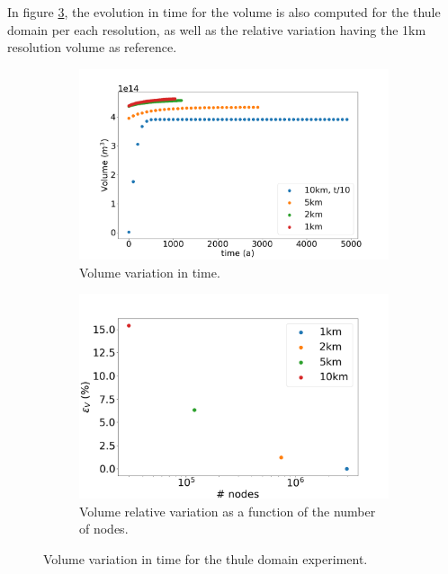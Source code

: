 \documentclass{article}
\begin{document}
In figure \ref{Volume_THULE_VS_TIME_VS_NODES}, the evolution in time for the volume is also computed for the thule domain per each resolution, as well as the relative variation having the 1km resolution volume as reference. 

\begin{figure}[!h]
	\centering
	\begin{subfigure}{.5\textwidth}
		\centering
		\includegraphics[width=1.1\linewidth]{../fig/Volume_THULE_full_all_res_vs_time.png}
		\caption{Volume variation in time.}
		\label{VOLUME_THULE_VS_TIME}
	\end{subfigure}%
	\begin{subfigure}{.5\textwidth}
		\centering
		\includegraphics[width=1.1\linewidth]{../fig/Volume_THULE_full_all_res_vs_num_nodes.png}
		\caption{Volume relative variation as a function of the number of nodes.}
		\label{VOLUME_THULE_VS_NODES}
	\end{subfigure}
	\caption{Volume variation in time for the thule domain experiment.}
	\label{Volume_THULE_VS_TIME_VS_NODES}
\end{figure}
\end{document}
